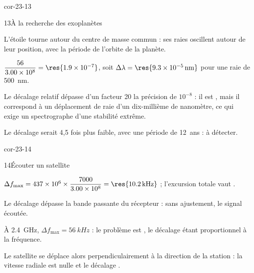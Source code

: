 \begin{blocLivre}{cor-23-13}
\begin{corrige}{13}{À la recherche des exoplanètes}
\begin{questions}
\item L'étoile tourne autour du centre de masse commun : ses raies oscillent  autour de leur position,
avec la période de l'orbite de la planète.
\item $\dfrac{56}{\num{3.00e8}}=\res{\num{1.9e-7}}$, soit $\Delta\lambda=\res{\qty{9,3e-5}{nm}}$ pour une raie de \qty{500}{nm}.
\item Le décalage relatif dépasse d'un facteur 20 la précision de $10^{-8}$ : il est , mais il correspond
à un déplacement de raie d'un dix-millième de nanomètre, ce qui exige un spectrographe d'une stabilité extrême.
\item Le décalage serait 4,5 fois plus faible, avec une période de 12~ans :  à détecter.
\end{questions}
\end{corrige}
\end{blocLivre}
\begin{blocLivre}{cor-23-14}
\begin{corrige}{14}{Écouter un satellite}
\begin{questions}
\item $\Delta f_\mathrm{max}=\num{437e6}\times\dfrac{7000}{\num{3.00e8}}=\res{\qty{10,2}{kHz}}$ ; l'excursion totale vaut .
\item Le décalage dépasse la bande passante du récepteur : sans ajustement, le signal  écoutée.
\item À \qty{2,4}{GHz}, $\Delta f_\mathrm{max}=\qty{56}{kHz}$ : le problème est , le décalage étant proportionnel à la
fréquence.
\item Le satellite se déplace alors perpendiculairement à la direction de la station : la vitesse radiale est nulle et le
décalage .
\end{questions}
\end{corrige}
\end{blocLivre}
